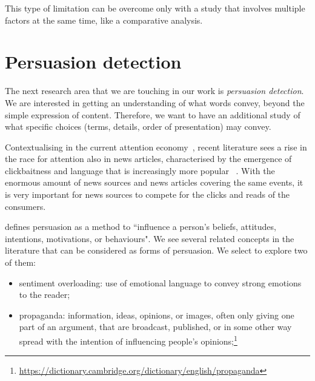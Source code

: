 This type of limitation can be overcome only with a study that involves multiple factors at the same time, like a comparative analysis.

\section{\statusgreen Persuasion detection}
\label{sec:lit_persuasion}

The next research area that we are touching in our work is \emph{persuasion detection}.
We are interested in getting an understanding of what words convey, beyond the simple expression of content.
Therefore, we want to have an additional study of what specific choices (terms, details, order of presentation) may convey.



Contextualising in the current attention economy~\citep{davenport2001attention}, recent literature sees a rise in the race for attention also in news articles, characterised by the emergence of clickbaitness and language that is increasingly more popular ~\citep{bazaco2019clickbait,davenport2001attention}.
With the enormous amount of news sources and news articles covering the same events, it is very important for news sources to compete for the clicks and reads of the consumers.

\cite{gass2018persuasion} defines persuasion as a method to ``influence a person's beliefs, attitudes, intentions, motivations, or behaviours".
We see several related concepts in the literature that can be considered as forms of persuasion. We select to explore two of them:
\begin{itemize}
    \item sentiment overloading: use of emotional language to convey strong emotions to the reader; %
    \item \gls{propaganda}:  information, ideas, opinions, or images, often only giving one part of an argument, that are broadcast, published, or in some other way spread with the intention of influencing people's opinions;\footnote{\url{https://dictionary.cambridge.org/dictionary/english/propaganda}} %
\end{itemize}

